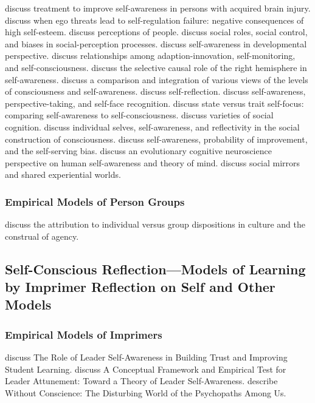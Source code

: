\cite{goverover:2007} discuss treatment to improve self-awareness in persons with acquired brain injury.
\cite{baumeister:1993} discuss when ego threats lead to self-regulation failure: negative consequences of high self-esteem.
\cite{gilbert:2005} discuss perceptions of people.
\cite{ross:2005} discuss social roles, social control, and biases in social-perception processes.
\cite{hobson:2006} discuss self-awareness in developmental perspective.
\cite{hutchinson:2007} discuss relationships among adaption-innovation, self-monitoring, and self-consciousness.
\cite{keenan:2007} discuss the selective causal role of the right hemisphere in self-awareness.
\cite{morin:2004} discuss a comparison and integration of various views of the levels of consciousness and self-awareness.
\cite{silverman:2008} discuss self-reflection.
\cite{smith:2007} discuss self-awareness, perspective-taking, and self-face recognition.
\cite{soeiro:2008} discuss state versus trait self-focus: comparing self-awareness to self-consciousness.
\cite{uhlmann:2008} discuss varieties of social cognition.
\cite{burns:1998} discuss individual selves, self-awareness, and reflectivity in the social construction of consciousness.
\cite{duval:2002} discuss self-awareness, probability of improvement, and the self-serving bias.
\cite{focquaert:2008} discuss an evolutionary cognitive neuroscience perspective on human self-awareness and theory of mind.
\cite{whitehead:2001} discuss social mirrors and shared experiential worlds.


\subsubsection{Empirical Models of Person Groups}

\cite{menon:2005} discuss the attribution to individual versus group dispositions in culture and the construal of agency.

\subsection{Self-Conscious Reflection---Models of Learning by Imprimer Reflection on Self and Other Models}

\subsubsection{Empirical Models of Imprimers}

\cite{hinton:2008} discuss The Role of Leader Self-Awareness in Building Trust and Improving Student Learning.
\cite{taylor:2007} discuss A Conceptual Framework and Empirical Test for Leader Attunement: Toward a Theory of Leader Self-Awareness.
\cite{hare:1993} describe Without Conscience: The Disturbing World of the Psychopaths Among Us.

